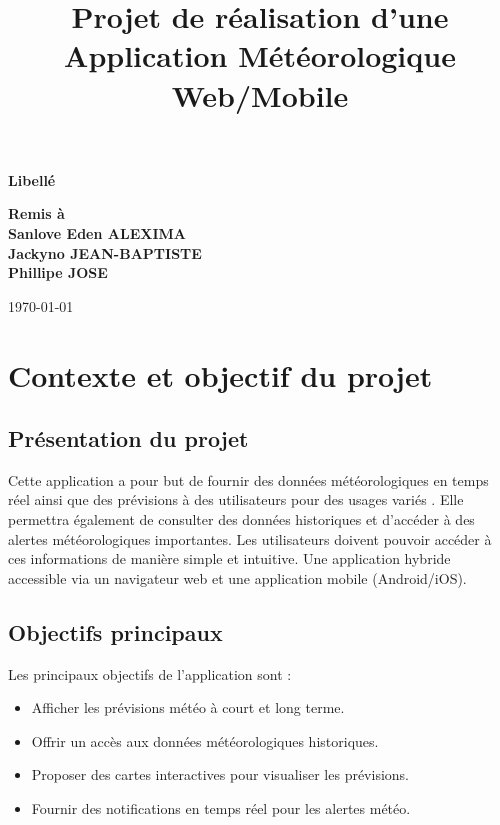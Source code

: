 \documentclass[a4paper,12pt]{article}
\title{Projet de réalisation d'une Application Météorologique Web/Mobile }
\author{}
\date{}
\begin{document}
\maketitle

\vfill %
\begin{center}
    \Huge \textbf{Libellé} %
\end{center}
\vfill %

\begin{center}
    \textbf{Remis à} \\[1em] %
    \textbf{Sanlove Eden ALEXIMA} \\
    \textbf{Jackyno JEAN-BAPTISTE} \\
    \textbf{Phillipe JOSE}
\end{center}

	
\begin{center}
    \today
\end{center}


\clearpage %

\tableofcontents %
\newpage %

\section{Contexte et objectif du projet}
\subsection{Présentation du projet}
Cette application a pour but de fournir des données météorologiques en temps réel ainsi que des prévisions à des utilisateurs pour des usages variés . 
Elle permettra également de consulter des données historiques et d'accéder à des alertes météorologiques importantes. Les utilisateurs doivent pouvoir accéder à ces informations de manière simple et intuitive. Une application hybride accessible via un navigateur web et une application mobile (Android/iOS).

\subsection{Objectifs principaux}
Les principaux objectifs de l'application sont :
\begin{itemize}
    \item Afficher les prévisions météo à court et long terme.
    \item Offrir un accès aux données météorologiques historiques.
    \item Proposer des cartes interactives pour visualiser les prévisions.
    \item Fournir des notifications en temps réel pour les alertes météo.
\end{itemize}
\end{document}
